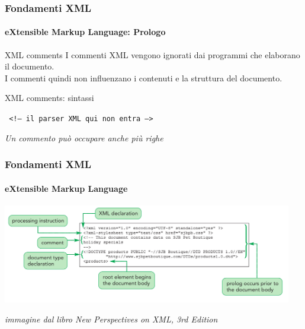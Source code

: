 \begin{frame}
	\frametitle{Fondamenti XML}
	\framesubtitle{eXtensible Markup Language: Prologo}
	\addtocounter{nframe}{1}

	\begin{block}{XML comments}
		I commenti XML vengono ignorati dai programmi che elaborano il documento.
		\\I commenti quindi non influenzano i contenuti e la struttura del documento.
	\end{block}

	\begin{block}{XML comments: sintassi}
	\begin{center}\texttt{
		<!-- il parser XML qui non entra -->
	}\end{center}
	\end{block}

	\textit{Un commento può occupare anche più righe}
	
\end{frame}

\begin{frame}
	\frametitle{Fondamenti XML}
	\framesubtitle{eXtensible Markup Language}
	\addtocounter{nframe}{1}

	\begin{center}
		\includegraphics[width=0.95\textwidth]{imgs/XML-Prologo.png}
    \end{center}
\begin{tiny}\textit{immagine dal libro New Perspectives on XML, 3rd Edition}\end{tiny}

\end{frame}

